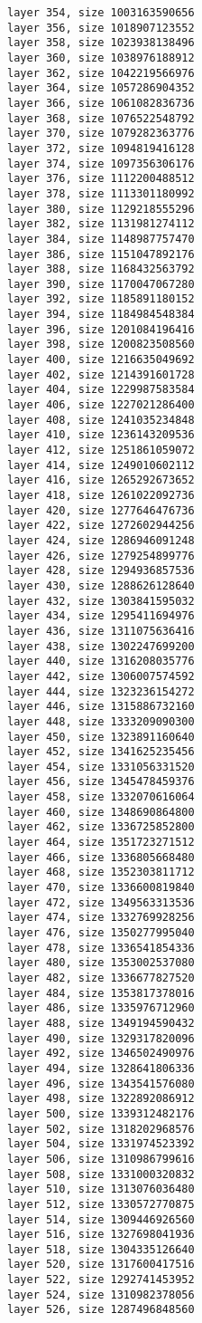 \documentclass[12pt]{article}
\begin{document}
\begin{verbatim}
layer 354, size 1003163590656
layer 356, size 1018907123552
layer 358, size 1023938138496
layer 360, size 1038976188912
layer 362, size 1042219566976
layer 364, size 1057286904352
layer 366, size 1061082836736
layer 368, size 1076522548792
layer 370, size 1079282363776
layer 372, size 1094819416128
layer 374, size 1097356306176
layer 376, size 1112200488512
layer 378, size 1113301180992
layer 380, size 1129218555296
layer 382, size 1131981274112
layer 384, size 1148987757470
layer 386, size 1151047892176
layer 388, size 1168432563792
layer 390, size 1170047067280
layer 392, size 1185891180152
layer 394, size 1184984548384
layer 396, size 1201084196416
layer 398, size 1200823508560
layer 400, size 1216635049692
layer 402, size 1214391601728
layer 404, size 1229987583584
layer 406, size 1227021286400
layer 408, size 1241035234848
layer 410, size 1236143209536
layer 412, size 1251861059072
layer 414, size 1249010602112
layer 416, size 1265292673652
layer 418, size 1261022092736
layer 420, size 1277646476736
layer 422, size 1272602944256
layer 424, size 1286946091248
layer 426, size 1279254899776
layer 428, size 1294936857536
layer 430, size 1288626128640
layer 432, size 1303841595032
layer 434, size 1295411694976
layer 436, size 1311075636416
layer 438, size 1302247699200
layer 440, size 1316208035776
layer 442, size 1306007574592
layer 444, size 1323236154272
layer 446, size 1315886732160
layer 448, size 1333209090300
layer 450, size 1323891160640
layer 452, size 1341625235456
layer 454, size 1331056331520
layer 456, size 1345478459376
layer 458, size 1332070616064
layer 460, size 1348690864800
layer 462, size 1336725852800
layer 464, size 1351723271512
layer 466, size 1336805668480
layer 468, size 1352303811712
layer 470, size 1336600819840
layer 472, size 1349563313536
layer 474, size 1332769928256
layer 476, size 1350277995040
layer 478, size 1336541854336
layer 480, size 1353002537080
layer 482, size 1336677827520
layer 484, size 1353817378016
layer 486, size 1335976712960
layer 488, size 1349194590432
layer 490, size 1329317820096
layer 492, size 1346502490976
layer 494, size 1328641806336
layer 496, size 1343541576080
layer 498, size 1322892086912
layer 500, size 1339312482176
layer 502, size 1318202968576
layer 504, size 1331974523392
layer 506, size 1310986799616
layer 508, size 1331000320832
layer 510, size 1313076036480
layer 512, size 1330572770875
layer 514, size 1309446926560
layer 516, size 1327698041936
layer 518, size 1304335126640
layer 520, size 1317600417516
layer 522, size 1292741453952
layer 524, size 1310982378056
layer 526, size 1287496848560

\end{verbatim}
\end{document}
